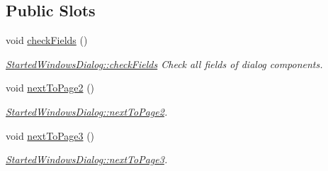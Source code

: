\subsection*{Public Slots}
\begin{DoxyCompactItemize}
\item 
\hypertarget{classGui_1_1Dialogs_1_1StartedWindowsDialog_a9ea73c16c7917ff50c596cd1942dabfa}{void \hyperlink{classGui_1_1Dialogs_1_1StartedWindowsDialog_a9ea73c16c7917ff50c596cd1942dabfa}{check\-Fields} ()}\label{classGui_1_1Dialogs_1_1StartedWindowsDialog_a9ea73c16c7917ff50c596cd1942dabfa}

\begin{DoxyCompactList}\small\item\em \hyperlink{classGui_1_1Dialogs_1_1StartedWindowsDialog_a9ea73c16c7917ff50c596cd1942dabfa}{Started\-Windows\-Dialog\-::check\-Fields} Check all fields of dialog components. \end{DoxyCompactList}\item 
\hypertarget{classGui_1_1Dialogs_1_1StartedWindowsDialog_afd791a73e2d897147b31c829131942af}{void \hyperlink{classGui_1_1Dialogs_1_1StartedWindowsDialog_afd791a73e2d897147b31c829131942af}{next\-To\-Page2} ()}\label{classGui_1_1Dialogs_1_1StartedWindowsDialog_afd791a73e2d897147b31c829131942af}

\begin{DoxyCompactList}\small\item\em \hyperlink{classGui_1_1Dialogs_1_1StartedWindowsDialog_afd791a73e2d897147b31c829131942af}{Started\-Windows\-Dialog\-::next\-To\-Page2}. \end{DoxyCompactList}\item 
\hypertarget{classGui_1_1Dialogs_1_1StartedWindowsDialog_abac16c4f9fc0a3481565530fa01d8494}{void \hyperlink{classGui_1_1Dialogs_1_1StartedWindowsDialog_abac16c4f9fc0a3481565530fa01d8494}{next\-To\-Page3} ()}\label{classGui_1_1Dialogs_1_1StartedWindowsDialog_abac16c4f9fc0a3481565530fa01d8494}

\begin{DoxyCompactList}\small\item\em \hyperlink{classGui_1_1Dialogs_1_1StartedWindowsDialog_abac16c4f9fc0a3481565530fa01d8494}{Started\-Windows\-Dialog\-::next\-To\-Page3}. \end{DoxyCompactList}\end{DoxyCompactItemize}
